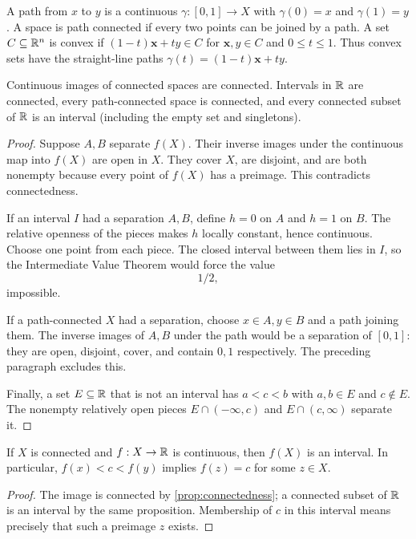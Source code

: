 \begin{definition}\label{def:euclidean-convexity}
A path from $x$ to $y$ is a continuous $\gamma:[0,1]\to X$ with
$\gamma(0)=x$ and $\gamma(1)=y$. A space is path connected if every two
points can be joined by a path. A set $C\subseteq\mathbb{R}^n$ is convex if
$(1-t)\mathbf{x}+ty\in C$ for $\mathbf{x},y\in C$ and $0\leq t\leq1$.
Thus convex sets have the straight-line paths $\gamma(t)=(1-t)\mathbf{x}+ty$.
\end{definition}
\begin{proposition}[Connectedness]\label{prop:connectedness}
Continuous images of connected spaces are connected. Intervals in $\mathbb{R}$
are connected, every path-connected space is connected, and every connected
subset of $\mathbb{R}$ is an interval (including the empty set and singletons).
\end{proposition}
\begin{proof}
Suppose $A,B$ separate $f(X)$. Their inverse images under the continuous
map into $f(X)$ are open in $X$. They cover $X$, are disjoint,
and are both nonempty because every point of $f(X)$ has a preimage. This
contradicts connectedness.

If an interval $I$ had a separation $A,B$, define $h=0$ on $A$ and $h=1$
on $B$. The relative openness of the pieces makes $h$ locally constant,
hence continuous. Choose one point from each piece. The closed interval
between them lies in $I$, so the Intermediate Value Theorem would force
the value
\[
1/2,
\]
 impossible.

If a path-connected $X$ had a separation, choose $x\in A,y\in B$ and a
path joining them. The inverse images of $A,B$ under the path would be a
separation of $[0,1]$: they are open, disjoint, cover, and contain $0,1$
respectively. The preceding paragraph excludes this.

Finally, a set $E\subseteq\mathbb{R}$ that is not an interval has $a<c<b$ with
$a,b\in E$ and $c\notin E$. The nonempty relatively open pieces
$E\cap(-\infty,c)$ and $E\cap(c,\infty)$ separate it.
\end{proof}
\begin{corollary}
\label{cor:connected-intermediate-value}
If $X$ is connected and $f:X\to\mathbb{R}$ is continuous, then $f(X)$ is an
interval. In particular, $f(x)<c<f(y)$ implies $f(z)=c$ for some $z\in X$.
\end{corollary}
\begin{proof}
The image is connected by \cref{prop:connectedness}; a connected subset
of $\mathbb{R}$ is an interval by the same proposition. Membership of $c$ in
this interval means precisely that such a preimage $z$ exists.
\end{proof}
